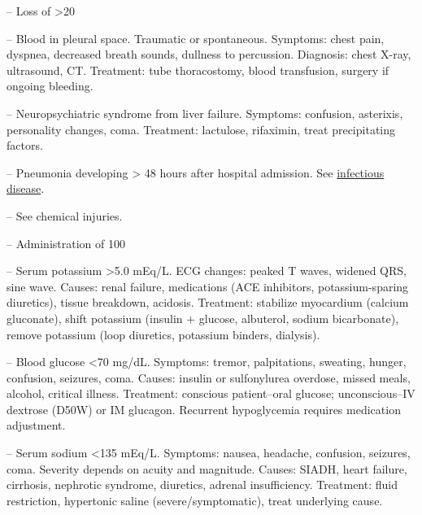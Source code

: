 -- Loss of >20%

-- Blood in pleural space. Traumatic or spontaneous. Symptoms: chest pain, dyspnea, decreased breath sounds, dullness to percussion. Diagnosis: chest X-ray, ultrasound, CT. Treatment: tube thoracostomy, blood transfusion, surgery if ongoing bleeding.

-- Neuropsychiatric syndrome from liver failure. Symptoms: confusion, asterixis, personality changes, coma. Treatment: lactulose, rifaximin, treat precipitating factors.

-- Pneumonia developing > 48 hours after hospital admission. See \hyperlink{Infectious Disease}{infectious disease}.

-- See chemical injuries.

-- Administration of 100%

-- Serum potassium >5.0 mEq/L. ECG changes: peaked T waves, widened QRS, sine wave. Causes: renal failure, medications (ACE inhibitors, potassium-sparing diuretics), tissue breakdown, acidosis. Treatment: stabilize myocardium (calcium gluconate), shift potassium (insulin + glucose, albuterol, sodium bicarbonate), remove potassium (loop diuretics, potassium binders, dialysis).

-- Blood glucose <70 mg/dL. Symptoms: tremor, palpitations, sweating, hunger, confusion, seizures, coma. Causes: insulin or sulfonylurea overdose, missed meals, alcohol, critical illness. Treatment: conscious patient--oral glucose; unconscious--IV dextrose (D50W) or IM glucagon. Recurrent hypoglycemia requires medication adjustment.

-- Serum sodium <135 mEq/L. Symptoms: nausea, headache, confusion, seizures, coma. Severity depends on acuity and magnitude. Causes: SIADH, heart failure, cirrhosis, nephrotic syndrome, diuretics, adrenal insufficiency. Treatment: fluid restriction, hypertonic saline (severe/symptomatic), treat underlying cause.


